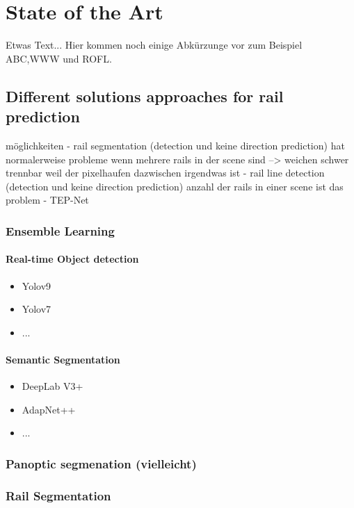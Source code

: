 \chapter{State of the Art}
\label{sec:stateOfTheArt}
Etwas Text... Hier kommen noch einige Abkürzunge vor zum Beispiel \ac{ABC},\ac{WWW} und \ac{ROFL}.

\section{Different solutions approaches for rail prediction}

möglichkeiten
- rail segmentation    (detection und keine direction prediction) hat normalerweise probleme wenn mehrere rails in der scene sind --> weichen schwer trennbar weil der pixelhaufen dazwischen irgendwas ist
- rail line detection  (detection und keine direction prediction) anzahl der rails in einer scene ist das problem
- TEP-Net


\subsection{Ensemble Learning}
\subsubsection{Real-time Object detection}

\begin{itemize}
    \item Yolov9
    \item Yolov7
    \item ...
\end{itemize}

\subsubsection{Semantic Segmentation}

\begin{itemize}
    \item DeepLab V3+
    \item AdapNet++
    \item ...
\end{itemize}

\subsection{Panoptic segmenation (vielleicht)}
\subsection{Rail Segmentation}
